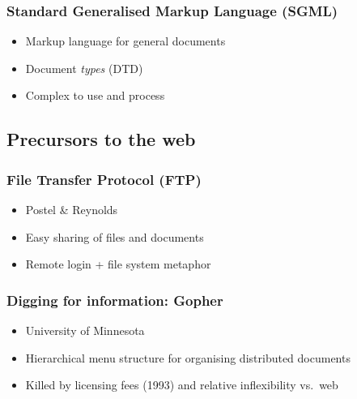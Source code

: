 \frame
{
	\frametitle{Standard Generalised Markup Language (SGML)}

	\begin{itemize}
	
		\item Markup language for general documents
		
		\item Document \emph{types} (DTD)
		
		
		\item Complex to use and process
	
	\end{itemize}
	
}




\subsection*{Precursors to the web}




{
	\frametitle{File Transfer Protocol (FTP)}

	\begin{itemize}
	
		\item Postel \& Reynolds
	
		\item Easy sharing of files and documents
		
		\item Remote login + file system metaphor
	
	\end{itemize}
	
}





\frame
{
	\frametitle{Digging for information: Gopher}
	
	\begin{itemize}
	
		\item University of Minnesota
		
		\item Hierarchical menu structure for organising distributed
		documents
		
		\item Killed by licensing fees (1993) and relative inflexibility
		vs.\ web
	
	\end{itemize}

}


